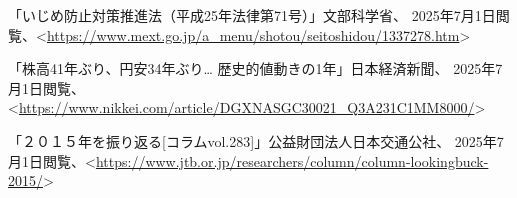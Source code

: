 \documentclass[uplatex,dvipdfmx]{jsarticle}
\begin{document}
\renewcommand{\refname}{注}
\begin{thebibliography}{11}

 「いじめ防止対策推進法（平成25年法律第71号）」文部科学省、
2025年7月1日閲覧、<\url{https://www.mext.go.jp/a_menu/shotou/seitoshidou/1337278.htm}>


 「株高41年ぶり、円安34年ぶり… 歴史的値動きの1年」日本経済新聞、
2025年7月1日閲覧、<\url{https://www.nikkei.com/article/DGXNASGC30021_Q3A231C1MM8000/}>


 「２０１５年を振り返る[コラムvol.283]」公益財団法人日本交通公社、
2025年7月1日閲覧、<\url{https://www.jtb.or.jp/researchers/column/column-lookingbuck-2015/}>


\end{thebibliography}
\end{document}
